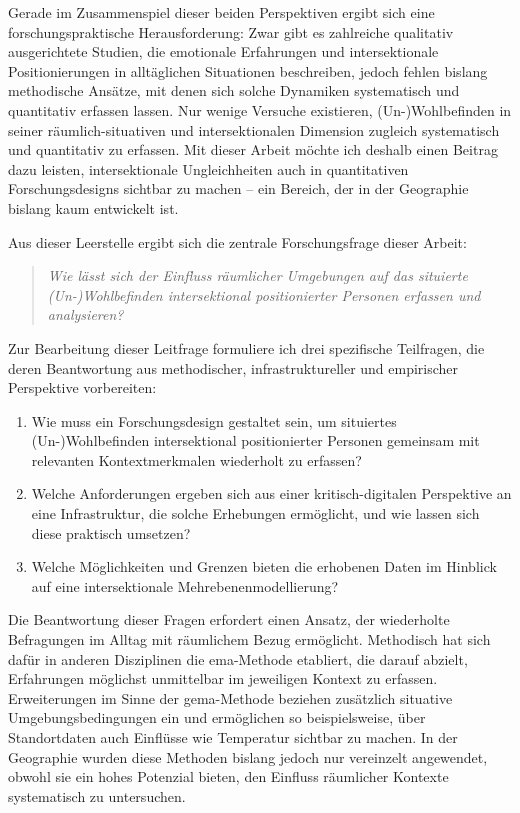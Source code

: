 Gerade im Zusammenspiel dieser beiden Perspektiven ergibt sich eine forschungspraktische Herausforderung: Zwar gibt es zahlreiche qualitativ ausgerichtete Studien, die emotionale Erfahrungen und intersektionale Positionierungen in alltäglichen Situationen beschreiben, jedoch fehlen bislang methodische Ansätze, mit denen sich solche Dynamiken systematisch und quantitativ erfassen lassen. Nur wenige Versuche existieren,  (Un-)Wohlbefinden in seiner räumlich-situativen und intersektionalen Dimension zugleich systematisch und quantitativ zu erfassen. Mit dieser Arbeit möchte ich deshalb einen Beitrag dazu leisten, intersektionale Ungleichheiten auch in quantitativen Forschungsdesigns sichtbar zu machen -- ein Bereich, der in der Geographie bislang kaum entwickelt ist.

\vspace{1em}

Aus dieser Leerstelle ergibt sich die zentrale Forschungsfrage dieser Arbeit:
\begin{quote}
\emph{Wie lässt sich der Einfluss räumlicher Umgebungen auf das situierte (Un-)Wohlbefinden intersektional positionierter Personen erfassen und analysieren?}
\end{quote}

Zur Bearbeitung dieser Leitfrage formuliere ich drei spezifische Teilfragen, die deren Beantwortung aus methodischer, infrastruktureller und empirischer Perspektive vorbereiten:

\begin{enumerate}
    \item Wie muss ein Forschungsdesign gestaltet sein, um situiertes (Un-)Wohlbefinden intersektional positionierter Personen gemeinsam mit relevanten Kontextmerkmalen wiederholt zu erfassen?
    \item Welche Anforderungen ergeben sich aus einer kritisch-digitalen Perspektive an eine Infrastruktur, die solche Erhebungen ermöglicht, und wie lassen sich diese praktisch umsetzen?
    \item Welche Möglichkeiten und Grenzen bieten die erhobenen Daten im Hinblick auf eine intersektionale Mehrebenenmodellierung?
\end{enumerate}


Die Beantwortung dieser Fragen erfordert einen Ansatz, der wiederholte Befragungen im Alltag mit räumlichem Bezug ermöglicht. Methodisch hat sich dafür in anderen Disziplinen die \gls{ema}-Methode etabliert, die darauf abzielt, Erfahrungen möglichst unmittelbar im jeweiligen Kontext zu erfassen. Erweiterungen im Sinne der \gls{gema}-Methode beziehen zusätzlich situative Umgebungsbedingungen ein und ermöglichen so beispielsweise, über Standortdaten auch Einflüsse wie Temperatur sichtbar zu machen. In der Geographie wurden diese Methoden bislang jedoch nur vereinzelt angewendet, obwohl sie ein hohes Potenzial bieten, den Einfluss räumlicher Kontexte systematisch zu untersuchen.

